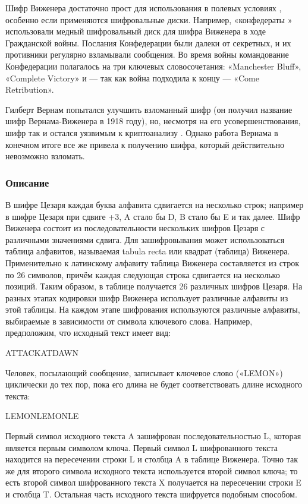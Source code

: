 Шифр Виженера достаточно прост для использования в полевых условиях
, особенно если применяются шифровальные диски. Например, «конфедераты
» использовали медный шифровальный диск для шифра Виженера в 
ходе Гражданской войны. Послания Конфедерации были далеки от 
секретных, и их противники регулярно взламывали сообщения. Во 
время войны командование Конфедерации полагалось на три ключевых 
словосочетания: «Manchester Bluff», «Complete Victory» и — так 
как война подходила к концу — «Come Retribution».

Гилберт Вернам попытался улучшить взломанный шифр (он получил 
название шифр Вернама-Виженера в 1918 году), но, несмотря на 
его усовершенствования, шифр так и остался уязвимым к криптоанализу
. Однако работа Вернама в конечном итоге все же привела к получению 
шифра, который действительно невозможно взломать.

\subsubsection{Описание}

В шифре Цезаря каждая буква алфавита сдвигается на несколько 
строк; например в шифре Цезаря при сдвиге +3, A стало бы D, B 
стало бы E и так далее. Шифр Виженера состоит из последовательности 
нескольких шифров Цезаря с различными значениями сдвига. Для 
зашифровывания может использоваться таблица алфавитов, называемая 
tabula recta или квадрат (таблица) Виженера. Применительно к 
латинскому алфавиту таблица Виженера составляется из строк по 
26 символов, причём каждая следующая строка сдвигается на несколько 
позиций. Таким образом, в таблице получается 26 различных шифров 
Цезаря. На разных этапах кодировки шифр Виженера использует различные 
алфавиты из этой таблицы. На каждом этапе шифрования используются 
различные алфавиты, выбираемые в зависимости от символа ключевого 
слова. Например, предположим, что исходный текст имеет вид:

ATTACKATDAWN

Человек, посылающий сообщение, записывает ключевое слово («LEMON») 
циклически до тех пор, пока его длина не будет соответствовать 
длине исходного текста:

LEMONLEMONLE

Первый символ исходного текста A зашифрован последовательностью 
L, которая является первым символом ключа. Первый символ L шифрованного 
текста находится на пересечении строки L и столбца A в таблице 
Виженера. Точно так же для второго символа исходного текста используется 
второй символ ключа; то есть второй символ шифрованного текста 
X получается на пересечении строки E и столбца T. Остальная часть 
исходного текста шифруется подобным способом.

